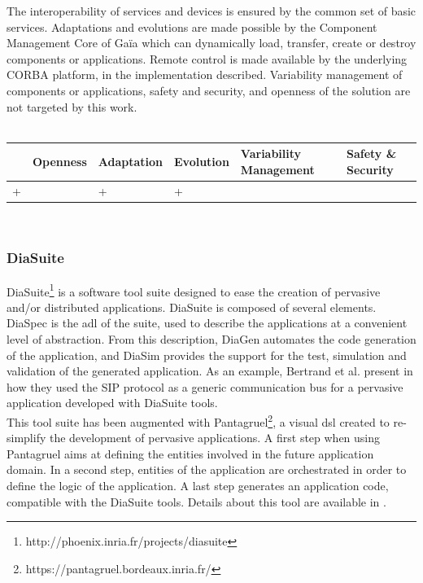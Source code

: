 The interoperability of services and devices is ensured by the common set of basic services. Adaptations and evolutions are made possible by the Component Management Core of Ga\"ia which can dynamically load, transfer, create or destroy components or applications. Remote control is made available by the underlying CORBA platform, in the implementation described. Variability management of components or applications, safety and security, and openness of the solution are not targeted by this work.\\
\\
\begin{tabular}{ >{\centering}m{}| >{\centering}m{} >{\centering}m{}| >{\centering}m{} >{\centering}m{}| >{\centering\arraybackslash}m{}}
{\tiny Interoperability} & {\tiny Openness} & {\tiny Adaptation} & {\tiny Evolution} & {\tiny Variability Management} & {\tiny Safety \& Security}\\
 \hline
 + &  & + & + &  &  \\ 
  \hline
\end{tabular}\\


\subsubsection{DiaSuite}
DiaSuite\footnote{http://phoenix.inria.fr/projects/diasuite} is a software tool suite designed to ease the creation of pervasive and/or distributed applications. DiaSuite\cite{CASSOU:2010} is composed of several elements. DiaSpec is the \gls{adl} of the suite, used to describe the applications at a convenient level of abstraction. From this description, DiaGen automates the code generation of the application, and DiaSim provides the support for the test, simulation and validation of the generated application. As an example, Bertrand et al. present in \cite{BERTRAN:2010} how they used the SIP protocol as a generic communication bus for a pervasive application developed with DiaSuite tools.\\
This tool suite has been augmented with Pantagruel\footnote{https://pantagruel.bordeaux.inria.fr/}, a visual \gls{dsl} created to re-simplify the development of pervasive applications. A first step when using Pantagruel aims at defining the entities involved in the future application domain. In a second step, entities of the application are orchestrated in order to define the logic of the application. A last step generates an application code, compatible with the DiaSuite tools. Details about this tool are available in \cite{DREY:2009}.\\

